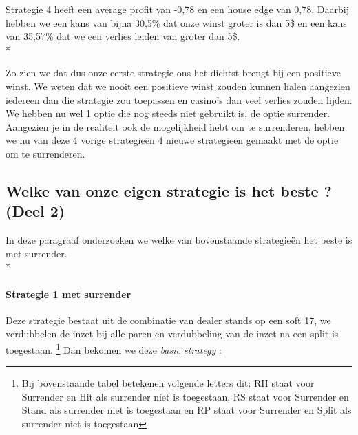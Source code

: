 \documentclass[conference]{IEEEtran}
\begin{document}
Strategie 4 heeft een average profit van -0,78 en een house edge van 0,78. Daarbij hebben we een kans van bijna 30,5\% dat onze winst groter is dan 5\$ en een kans van 35,57\% dat we een verlies leiden van groter dan 5\$. \\*
 
Zo zien we dat dus onze eerste strategie ons het dichtst brengt bij een positieve winst. We weten dat we nooit een positieve winst zouden kunnen halen aangezien iedereen dan die strategie zou toepassen en casino's dan veel verlies zouden lijden.
We hebben nu wel 1 optie die nog steeds niet gebruikt is, de optie surrender. Aangezien je in de realiteit ook de mogelijkheid hebt om te surrenderen, hebben we nu van deze 4 vorige strategie\"en 4 nieuwe strategie\"en gemaakt met de optie om te surrenderen. 
 
 
\newpage

\subsection{Welke van onze eigen strategie is het beste ? (Deel 2)}
In deze paragraaf onderzoeken we welke van bovenstaande strategieën het beste is met surrender.\\*

\paragraph{Strategie 1 met surrender}

Deze strategie bestaat uit de combinatie van dealer stands op een soft 17, we verdubbelen de inzet bij alle paren en verdubbeling van de inzet na een split is toegestaan. \footnote{ Bij bovenstaande tabel betekenen volgende letters dit: RH staat voor Surrender en Hit als surrender niet is toegestaan, RS staat voor Surrender en Stand als surrender niet is toegestaan en RP staat voor Surrender en Split als surrender niet is toegestaan}
Dan bekomen we deze \textit{basic strategy} :
\end{document}
